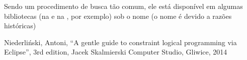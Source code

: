 \inputminted{prolog}{../Exemplos/Cap10/prog4_busca.ecl}

Sendo um procedimento de busca tão comum, ele está disponível em algumas bibliotecas \eclipse (na
 e na , por exemplo) sob o nome  (o nome
 é devido a razões históricas)



  \begin{thebibliography}{2}

    Niederliński, Antoni,
    ``A gentle guide to constraint logical programming via Eclipse'',
    3rd edition, Jacek Skalmierski Computer Studio, Gliwice, 2014

  \end{thebibliography}

%
